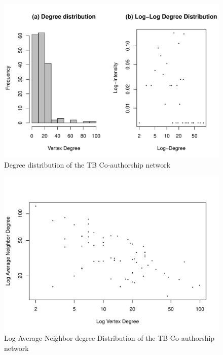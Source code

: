 \begin{figure}[h!]
\centering
\includegraphics[scale=0.65]{Chapters/tb/degreeDistribution}
\caption{Degree distribution of the TB Co-authorship network}
\label{tb_fig1}
\end{figure}

\begin{figure}[h!]
\centering
\includegraphics[scale=0.65]{Chapters/tb/logAvgDegree}
\caption{Log-Average Neighbor degree Distribution of the TB Co-authorship network}
\label{tb_fig2}
\end{figure}

